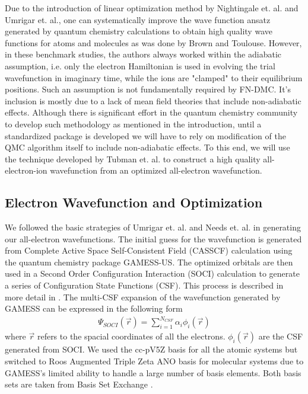 \documentclass[aps,prl,superscriptaddress,groupedaddress]{revtex4}
\begin{document}
Due to the introduction of linear optimization method by Nightingale et. al.\cite{Nightingale_Linear} and Umrigar et. al.\cite{Umrigar_Linear}, one can systematically improve the wave function ansatz generated by quantum chemistry calculations to obtain high quality wave functions for atoms and molecules as was done by Brown\cite{Brown_Bench} and Toulouse\cite{Toulouse_Bench}. However, in these benchmark studies, the authors always worked within the adiabatic assumption, i.e. only the electron Hamiltonian is used in evolving the trial wavefunction in imaginary time, while the ions are "clamped" to their equilibrium positions. Such an assumption is not fundamentally required by FN-DMC. It's inclusion is mostly due to a lack of mean field theories that include non-adiabatic effects. Although there is significant effort in the quantum chemistry community to develop such methodology as mentioned in the introduction, until a standardized package is developed we will have to rely on modification of the QMC algorithm itself to include non-adiabatic effects. To this end, we will use the technique developed by Tubman et. al. \cite{Tubman_ECG} to construct a high quality all-electron-ion wavefunction from an optimized all-electron wavefunction.

\subsection{Electron Wavefunction and Optimization}
We followed the basic strategies of Umrigar et. al.\cite{Umrigar_Alleviation,Toulouse_Bench} and Needs et. al. \cite{Brown_Bench,Seth_Bench} in generating our all-electron wavefunctions. The initial guess for the wavefunction is generated from Complete Active Space Self-Consistent Field (CASSCF) \cite{Chaban_MCSCF,Szabo} calculation using the quantum chemistry package GAMESS-US\cite{GAMESS}. The optimized orbitals are then used in a Second Order Configuration Interaction (SOCI) calculation to generate a series of Configuration State Functions (CSF). This process is described in more detail in \cite{Clark_Bench}. The multi-CSF expansion of the wavefunction generated by GAMESS can be expressed in the following form
\begin{align}
\Psi_{SOCI}(\vec{r})=\sum\limits_{i=1}^{N_{CSF}}\alpha_i\phi_i(\vec{r}) \label{eq:psi_gms}
\end{align}
where $\vec{r}$ refers to the spacial coordinates of all the electrons. $\phi_i(\vec{r})$ are the CSF generated from SOCI. We used the cc-pV5Z basis for all the atomic systems but switched to Roos Augmented Triple Zeta ANO basis for molecular systems due to GAMESS's limited ability to handle a large number of basis elements. Both basis sets are taken from Basis Set Exchange \cite{BSE}.
\end{document}
